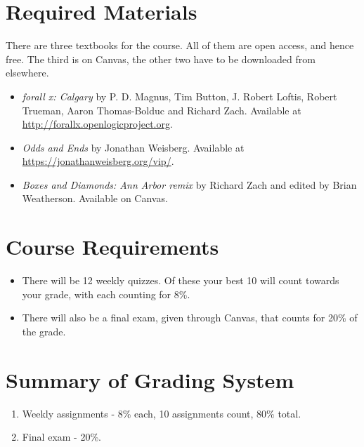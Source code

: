 \documentclass[
]{article}
\providecommand{\tightlist}{%
  \setlength{\itemsep}{0pt}\setlength{\parskip}{0pt}}
\begin{document}
\hypertarget{required-materials}{%
\section{Required Materials}\label{required-materials}}

There are three textbooks for the course. All of them are open access,
and hence free. The third is on Canvas, the other two have to be
downloaded from elsewhere.

\begin{itemize}
\tightlist
\item
  \emph{forall x: Calgary} by P. D. Magnus, Tim Button, J. Robert
  Loftis, Robert Trueman, Aaron Thomas-Bolduc and Richard Zach.
  Available at \url{http://forallx.openlogicproject.org}.
\item
  \emph{Odds and Ends} by Jonathan Weisberg. Available at
  \url{https://jonathanweisberg.org/vip/}.
\item
  \emph{Boxes and Diamonds: Ann Arbor remix} by Richard Zach and edited
  by Brian Weatherson. Available on Canvas.
\end{itemize}

\newpage

\hypertarget{course-requirements}{%
\section{Course Requirements}\label{course-requirements}}

\begin{itemize}
\tightlist
\item
  There will be 12 weekly quizzes. Of these your best 10 will count
  towards your grade, with each counting for 8\%.
\item
  There will also be a final exam, given through Canvas, that counts for
  20\% of the grade.
\end{itemize}

\hypertarget{summary-of-grading-system}{%
\section{Summary of Grading System}\label{summary-of-grading-system}}

\begin{enumerate}
\def\labelenumi{\arabic{enumi}.}
\tightlist
\item
  Weekly assignments - 8\% each, 10 assignments count, 80\% total.
\item
  Final exam - 20\%.
\end{enumerate}
\end{document}
